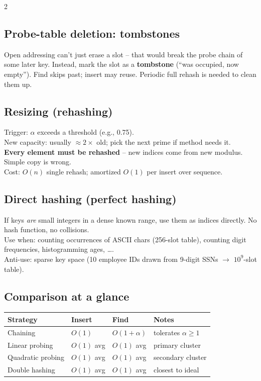 \documentclass[10pt]{article}
\begin{document}
\begin{multicols}{2}
\subsection*{Probe-table deletion: tombstones}
Open addressing can't just erase a slot -- that would break the probe
chain of some later key. Instead, mark the slot as a \textbf{tombstone}
(``was occupied, now empty''). Find skips past; insert may reuse.
Periodic full rehash is needed to clean them up.

\subsection*{Resizing (rehashing)}
Trigger: $\alpha$ exceeds a threshold (e.g., 0.75).\\
New capacity: usually $\approx 2\times$ old; pick the next prime if
method needs it.\\
\textbf{Every element must be rehashed} -- new indices come from new
modulus. Simple copy is wrong.\\
Cost: $O(n)$ single rehash; amortized $O(1)$ per insert over sequence.

\subsection*{Direct hashing (perfect hashing)}
If keys \emph{are} small integers in a dense known range, use them as
indices directly. No hash function, no collisions.\\
Use when: counting occurrences of ASCII chars (256-slot table),
counting digit frequencies, histogramming ages, \ldots.\\
Anti-use: sparse key space (10 employee IDs drawn from 9-digit SSNs
$\to$ $10^9$-slot table).

\subsection*{Comparison at a glance}
\begin{tabular}{@{}l|lll@{}}
\textbf{Strategy}   & \textbf{Insert} & \textbf{Find}   & \textbf{Notes}\\
\hline
Chaining            & $O(1)$          & $O(1+\alpha)$   & tolerates $\alpha \geq 1$\\
Linear probing      & $O(1)$ avg      & $O(1)$ avg      & primary cluster\\
Quadratic probing   & $O(1)$ avg      & $O(1)$ avg      & secondary cluster\\
Double hashing      & $O(1)$ avg      & $O(1)$ avg      & closest to ideal
\end{tabular}


\end{multicols}
\end{document}
